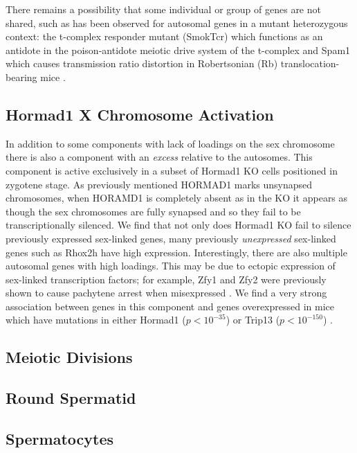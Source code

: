 There remains a possibility that some individual or group of genes are not shared, such as has been observed for autosomal genes in a mutant heterozygous context: the t-complex responder mutant (SmokTcr) which functions as an antidote in the poison-antidote meiotic drive system of the t-complex \cite{Veron2009retention} and Spam1 which causes transmission ratio distortion in Robertsonian (Rb) translocation-bearing mice \cite{martin2005spam1}.


\subsection{Hormad1 X Chromosome Activation}
In addition to some components with lack of loadings on the sex chromosome there is also a component with an \textit{excess} relative to the autosomes. This component is active exclusively in a subset of Hormad1 KO cells positioned in zygotene stage. As previously mentioned HORMAD1 marks unsynapsed chromosomes, when HORAMD1 is completely absent as in the KO it appears as though the sex chromosomes are fully synapsed and so they fail to be transcriptionally silenced. We find that not only does Hormad1 KO fail to silence previously expressed sex-linked genes, many previously \textit{unexpressed} sex-linked genes such as Rhox2h have high expression. Interestingly, there are also multiple autosomal genes with high loadings. This may be due to ectopic expression of sex-linked transcription factors; for example, Zfy1 and Zfy2 were previously shown to cause pachytene arrest when misexpressed \cite{royo2010evidence}. We find a very strong association between genes in this component and genes overexpressed in mice which have mutations in either Hormad1 ($p<10^{-35}$) or Trip13 ($p<10^{-150}$) \cite{ortega2016surveillance}.


\subsection{Meiotic Divisions}

\subsection{Round Spermatid}

\subsection{Spermatocytes}


